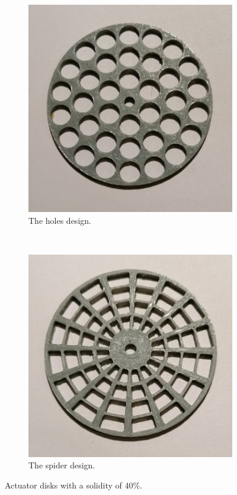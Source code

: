 \begin{figure} [h!]
    \centering
    \begin{subfigure}[b]{0.45\linewidth}
        \includegraphics[width=\textwidth]{0_Images/holes40.jpg}
        \caption{The \gls{holes} design.}
        \label{Fig:holes40}
    \end{subfigure}
    ~
    \begin{subfigure}[b]{0.45\linewidth}
        \includegraphics[width=\textwidth]{0_Images/spider40.jpg}
        \caption{The \gls{spider} design.}
        \label{Fig:spider40}
    \end{subfigure}
    \caption{Actuator disks with a solidity of 40\%.}
    \label{Fig:40Sol}
\end{figure}

